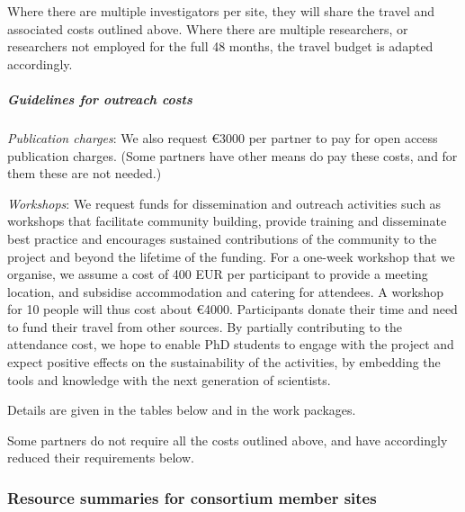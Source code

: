 Where there are multiple investigators per site, they will share the
travel and associated costs outlined above. Where there are multiple
researchers, or researchers not employed for the full 48 months, the
travel budget is adapted accordingly.



\subparagraph{Guidelines for outreach costs}

\label{sect:budget-outreach-publication-charges}
\emph{Publication charges}: We also request \euro{3000} per partner to pay for open
access publication charges.  (Some partners have other means do pay
these costs, and for them these are not needed.)

\label{sect:budget-outreach-workshops}
\emph{Workshops}: We request funds for dissemination and outreach
activities such as workshops that facilitate community building,
provide training and disseminate best practice and encourages
sustained contributions of the community to the project and beyond the
lifetime of the funding. For a one-week workshop that we organise, we
assume a cost of 400 EUR per participant to provide a meeting
location, and subsidise accommodation and catering for attendees. A
workshop for 10 people will thus cost about \euro{4000}. Participants
donate their time and need to fund their travel from other sources. By
partially contributing to the attendance cost, we hope to enable PhD
students to engage with the project and expect positive effects on the
sustainability of the activities, by embedding the tools and knowledge
with the next generation of scientists.

Details are given in the tables below and in the work packages.

\bigskip

\noindent Some partners do not require all the costs outlined above, and have
accordingly reduced their requirements below.
\bigskip


 \subsubsection{Resource summaries for consortium member sites}
 \label{resources.summary}

